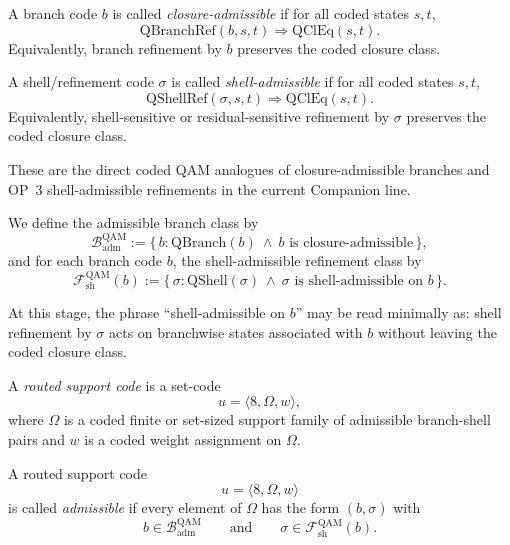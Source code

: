 \begin{definition}
A branch code $b$ is called \emph{closure-admissible} if for all coded states $s,t$,
\[
\mathrm{QBranchRef}(b,s,t)\Longrightarrow \mathrm{QClEq}(s,t).
\]
Equivalently, branch refinement by $b$ preserves the coded closure class.
\end{definition}

\begin{definition}
A shell/refinement code $\sigma$ is called \emph{shell-admissible} if for all coded states $s,t$,
\[
\mathrm{QShellRef}(\sigma,s,t)\Longrightarrow \mathrm{QClEq}(s,t).
\]
Equivalently, shell-sensitive or residual-sensitive refinement by $\sigma$ preserves the coded closure class.
\end{definition}

\begin{remark}
These are the direct coded QAM analogues of closure-admissible branches and OP~3 shell-admissible refinements in the current Companion line.
\end{remark}

\begin{definition}
We define the admissible branch class by
\[
\mathcal{B}^{\mathrm{QAM}}_{\mathrm{adm}}
:=
\{\,b:\mathrm{QBranch}(b)\ \wedge\ b\text{ is closure-admissible}\,\},
\]
and for each branch code $b$, the shell-admissible refinement class by
\[
\mathcal{F}^{\mathrm{QAM}}_{\mathrm{sh}}(b)
:=
\{\,\sigma:\mathrm{QShell}(\sigma)\ \wedge\ \sigma\text{ is shell-admissible on }b\,\}.
\]
\end{definition}

\begin{remark}
At this stage, the phrase ``shell-admissible on $b$'' may be read minimally as: shell refinement by $\sigma$ acts on branchwise states associated with $b$ without leaving the coded closure class.
\end{remark}

\begin{definition}
A \emph{routed support code} is a set-code
\[
u=\langle 8,\Omega,w\rangle,
\]
where $\Omega$ is a coded finite or set-sized support family of admissible branch-shell pairs and $w$ is a coded weight assignment on $\Omega$.
\end{definition}

\begin{definition}
A routed support code
\[
u=\langle 8,\Omega,w\rangle
\]
is called \emph{admissible} if every element of $\Omega$ has the form $(b,\sigma)$ with
\[
b\in \mathcal{B}^{\mathrm{QAM}}_{\mathrm{adm}}
\qquad\text{and}\qquad
\sigma\in \mathcal{F}^{\mathrm{QAM}}_{\mathrm{sh}}(b).
\]
\end{definition}

